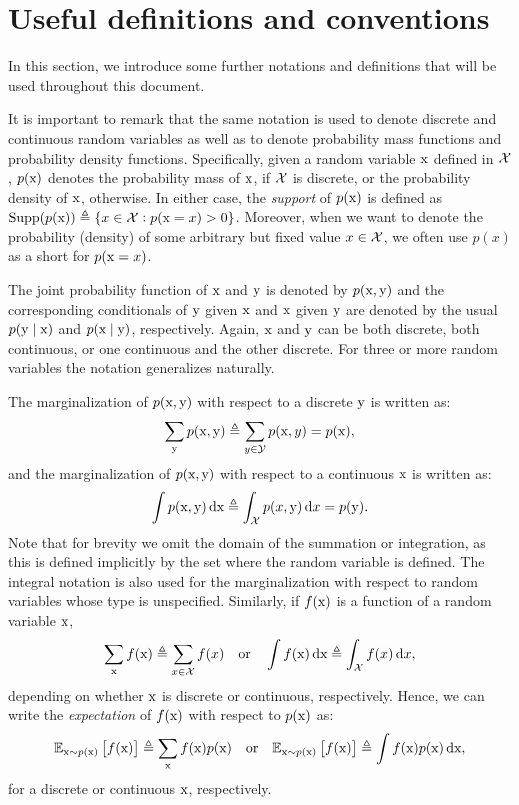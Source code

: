 \section{Useful definitions and conventions}
\label{sec:definitions}
In this section, we introduce some further notations and definitions that will be used throughout this document.

It is important to remark that the same notation is used to denote discrete and continuous random variables as well as to denote probability mass functions and probability density functions. Specifically, given a random variable ${\textnormal{x}}$ defined in ${\mathcal{X}}$, $p({\textnormal{x}})$ denotes the probability mass of ${\textnormal{x}}$, if ${\mathcal{X}}$ is discrete, or the probability density of ${\textnormal{x}}$, otherwise. In either case, the \emph{support} of $p({\textnormal{x}})$ is defined as $\mathrm{Supp}(p({\textnormal{x}})) \triangleq \lbrace x \in {\mathcal{X}}: p({\textnormal{x}}=x) > 0 \rbrace$. Moreover, when we want to denote the probability (density) of some arbitrary but fixed value $x \in {\mathcal{X}}$, we often use $p(x)$ as a short for $p({\textnormal{x}}=x)$.

The joint probability function of ${\textnormal{x}}$ and ${\textnormal{y}}$ is denoted by $p({\textnormal{x}},{\textnormal{y}})$ and the corresponding conditionals of ${\textnormal{y}}$ given ${\textnormal{x}}$ and ${\textnormal{x}}$ given ${\textnormal{y}}$ are denoted by the usual $p({\textnormal{y}} \mid {\textnormal{x}})$ and $p({\textnormal{x}} \mid {\textnormal{y}})$, respectively. Again, ${\textnormal{x}}$ and ${\textnormal{y}}$ can be both discrete, both continuous, or one continuous and the other discrete. For three or more random variables the notation generalizes naturally.

The marginalization of $p({\textnormal{x}},{\textnormal{y}})$ with respect to a discrete ${\textnormal{y}}$ is written as:
\begin{equation}
    \sum_{{\textnormal{y}}} p({\textnormal{x}},{\textnormal{y}}) \triangleq \sum_{y \in {\mathcal{Y}}} p({\textnormal{x}},y) = p({\textnormal{x}}),
\end{equation}
and the marginalization of $p({\textnormal{x}},{\textnormal{y}})$ with respect to a continuous ${\textnormal{x}}$ is written as:
\begin{equation}
    \int p({\textnormal{x}},{\textnormal{y}}) {\,\text{d}} {\textnormal{x}} \triangleq \int_{{\mathcal{X}}} p(x,{\textnormal{y}}) {\,\text{d}} x = p({\textnormal{y}}).
\end{equation}
Note that for brevity we omit the domain of the summation or integration, as this is defined implicitly by the set where the random variable is defined. The integral notation is also used for the marginalization with respect to random variables whose type is unspecified. Similarly, if $f({\textnormal{x}})$ is a function of a random variable ${\textnormal{x}}$,
\begin{equation}
    \sum_{\textnormal{x}} f({\textnormal{x}}) \triangleq \sum_{x \in {\mathcal{X}}} f(x) \quad \text{or} \quad \int f({\textnormal{x}}) {\,\text{d}} {\textnormal{x}} \triangleq \int_{\mathcal{X}} f(x) {\,\text{d}} x,
\end{equation}
depending on whether ${\textnormal{x}}$ is discrete or continuous, respectively. Hence, we can write the \emph{expectation} of $f({\textnormal{x}})$ with respect to $p({\textnormal{x}})$ as:
\begin{equation}
    \mathbb{E}_{{\textnormal{x}} \sim p({\textnormal{x}})} \left[f({\textnormal{x}})\right] \triangleq \sum_{\textnormal{x}} f({\textnormal{x}}) p({\textnormal{x}}) \quad \text{or} \quad \mathbb{E}_{{\textnormal{x}} \sim p({\textnormal{x}})} \left[f({\textnormal{x}})\right] \triangleq \int f({\textnormal{x}}) p({\textnormal{x}}) {\,\text{d}} {\textnormal{x}},
\end{equation}
for a discrete or continuous ${\textnormal{x}}$, respectively.

